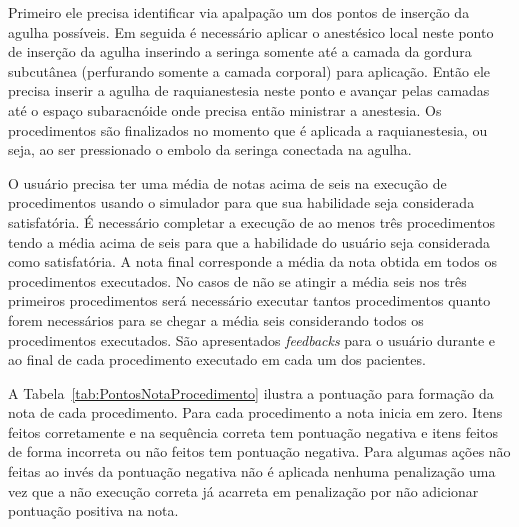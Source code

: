 Primeiro ele precisa identificar via apalpação um dos pontos de inserção da agulha possíveis. Em seguida é necessário aplicar o anestésico local neste ponto de inserção da agulha inserindo a seringa somente até a camada da gordura subcutânea (perfurando somente a camada corporal) para aplicação. Então ele precisa inserir a agulha de raquianestesia neste ponto e avançar pelas camadas até o espaço subaracnóide onde precisa então ministrar a anestesia. Os procedimentos são finalizados no momento que é aplicada a raquianestesia, ou seja, ao ser pressionado o embolo da seringa conectada na agulha.

O usuário precisa ter uma média de notas acima de seis na execução de procedimentos usando o simulador para que sua habilidade seja considerada satisfatória. É necessário completar a execução de ao menos três procedimentos tendo a média acima de seis para que a habilidade do usuário seja considerada como satisfatória. A nota final corresponde a média da nota obtida em todos os procedimentos executados. No casos de não se atingir a média seis nos três primeiros procedimentos será necessário executar tantos procedimentos quanto forem necessários para se chegar a média seis considerando todos os procedimentos executados. São apresentados \textit{feedbacks} para o usuário durante e ao final de cada procedimento executado em cada um dos pacientes.  

A Tabela~\ref{tab:PontosNotaProcedimento} ilustra a pontuação para formação da nota de cada procedimento. Para cada procedimento a nota inicia em zero. Itens feitos corretamente e na sequência correta tem pontuação negativa e itens feitos de forma incorreta ou não feitos tem pontuação negativa. Para algumas ações não feitas ao invés da pontuação negativa não é aplicada nenhuma penalização uma vez que a não execução correta já acarreta em penalização por não adicionar pontuação positiva na nota. 

